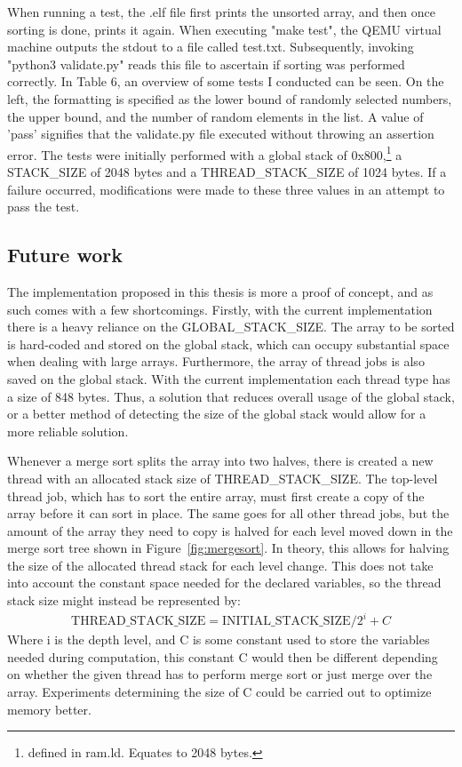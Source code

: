 When running a test, the .elf file first prints the unsorted array, and then once
sorting is done, prints it again. When executing "make test", the QEMU
virtual machine outputs the stdout to a file called test.txt. Subsequently,
invoking "python3 validate.py" reads this file to ascertain if sorting was
performed correctly. In Table 6, an overview of some tests I conducted can be
seen. On the left, the formatting is specified as the lower bound of randomly
selected numbers, the upper bound, and the number of random elements in the
list. A value of 'pass' signifies that the validate.py file executed without
throwing an assertion error. The tests were initially performed with a global
stack of 0x800,\footnote{defined in ram.ld. Equates to 2048 bytes.} a
STACK\_SIZE of 2048 bytes and a THREAD\_STACK\_SIZE of 1024 bytes. If a failure occurred,
modifications were made to these three values in an attempt to pass the test.

\subsection{Future work}
The implementation proposed in this thesis is more a proof of concept, and as
such comes with a few shortcomings. Firstly, with the current implementation
there is a heavy reliance on the GLOBAL\_STACK\_SIZE. The array to be sorted is
hard-coded and stored on the global stack, which can occupy substantial space
when dealing with large arrays. Furthermore, the array of thread jobs is also
saved on the global stack. With the current implementation each thread type has
a size of 848 bytes. Thus, a solution that reduces overall usage of the global
stack, or a better method of detecting the size of the global stack would allow
for a more reliable solution.

Whenever a merge sort splits the array into two halves, there is created a new
thread with an allocated stack size of THREAD\_STACK\_SIZE. The top-level thread
job, which has to sort the entire array, must first create a copy of the array
before it can sort in place. The same goes for all other thread jobs, but the
amount of the array they need to copy is halved for each level moved down in the
merge sort tree shown in Figure~\ref{fig:mergesort}. In theory, this allows for
halving the size of the allocated thread stack for each level change. This does
not take into account the constant space needed for the declared variables, so
the thread stack size might instead be represented by:
\begin{align}
  \text{THREAD\_STACK\_SIZE} = \text{INITIAL\_STACK\_SIZE} / 2^i + C
\end{align}
Where i is the depth level, and C is some constant used to store the variables
needed during computation, this constant C would then be different depending on
whether the given thread has to perform merge sort or just merge over the array.
Experiments determining the size of C could be carried out to optimize
memory better.

